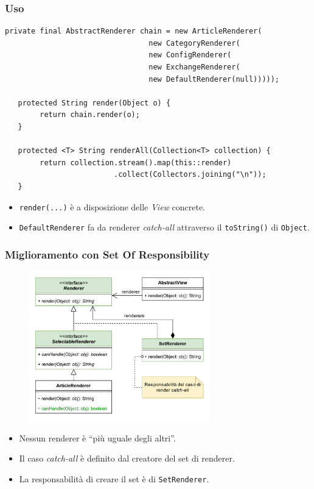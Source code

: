 \begin{frame}[fragile]
  \frametitle{Uso}
  \begin{lstlisting}[autogobble, title={\texttt{AbstractView.java}}]
   private final AbstractRenderer chain = new ArticleRenderer(
                                 new CategoryRenderer(
                                 new ConfigRenderer(
                                 new ExchangeRenderer(
                                 new DefaultRenderer(null)))));

   protected String render(Object o) {
        return chain.render(o);
   }

   protected <T> String renderAll(Collection<T> collection) {
        return collection.stream().map(this::render)
                         .collect(Collectors.joining("\n"));
   }
  \end{lstlisting}
    \begin{itemize}
        \item \texttt{render(...)} è a disposizione delle \emph{View} concrete.
        \item \texttt{DefaultRenderer} fa da renderer \emph{catch-all}
        attraverso il \texttt{toString()} di \texttt{Object}.
    \end{itemize}
\end{frame}

\begin{frame}
    \frametitle{Miglioramento con Set Of Responsibility}

    \begin{figure}
        \includegraphics[width=0.7\textwidth]{img/setofresponsibility.png}
    \end{figure}
    \begin{itemize}
      \item Nessun renderer è ``più uguale degli altri''.
      \item Il caso \emph{catch-all} è definito dal creatore del set di renderer.
      \item La responsabilità di creare il set è di \texttt{SetRenderer}.
    \end{itemize}
\end{frame}

